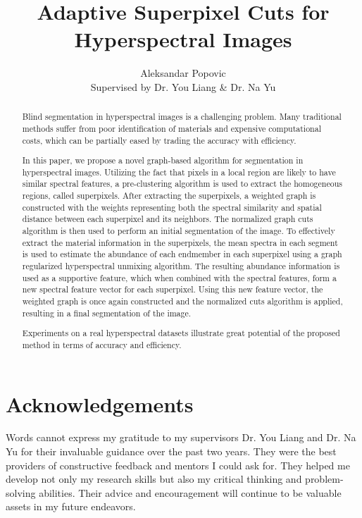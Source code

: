 \documentclass[10pt]{article}
\title{Adaptive Superpixel Cuts for Hyperspectral Images}
\author{Aleksandar Popovic \\ Supervised by Dr. You Liang \& Dr. Na Yu}
\date{}
\begin{document}
\maketitle

\begin{abstract}
    Blind segmentation in hyperspectral images is a challenging problem. Many traditional methods suffer from poor identification of materials and expensive computational costs, which can be partially eased by trading the accuracy with efficiency.

    In this paper, we propose a novel graph-based algorithm for segmentation in hyperspectral images. Utilizing the fact that pixels in a local region are likely to have similar spectral features, a pre-clustering algorithm is used to extract the homogeneous regions, called superpixels. After extracting the superpixels, a weighted graph is constructed with the weights representing both the spectral similarity and spatial distance between each superpixel and its neighbors. The normalized graph cuts algorithm is then used to perform an initial segmentation of the image. To effectively extract the material information in the superpixels, the mean spectra in each segment is used to estimate the abundance of each endmember in each superpixel using a graph regularized hyperspectral unmixing algorithm. The resulting abundance information is used as a supportive feature, which when combined with the spectral features, form a new spectral feature vector for each superpixel. Using this new feature vector, the weighted graph is once again constructed and the normalized cuts algorithm is applied, resulting in a final segmentation of the image.

    Experiments on a real hyperspectral datasets illustrate great potential of the proposed method in terms of accuracy and efficiency.
\end{abstract}

\clearpage
% 
% 
% 
% 
% 
\section*{Acknowledgements}

Words cannot express my gratitude to my supervisors Dr. You Liang and Dr. Na Yu for their invaluable guidance over the past two years. They were the best providers of constructive feedback and mentors I could ask for. They helped me develop not only my research skills but also my critical thinking and problem-solving abilities. Their advice and encouragement will continue to be valuable assets in my future endeavors.
\end{document}
